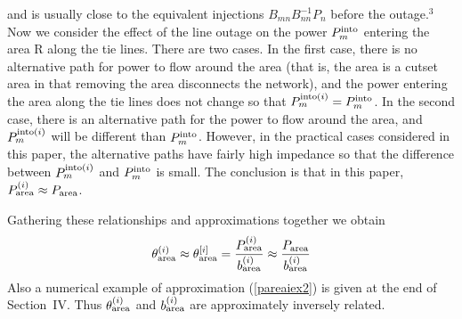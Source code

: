 \documentclass[conference]{IEEEtran}
\begin{document}
 and is usually close to the equivalent injections $B_{mn}B_{nn}^{-1}P_{n}$ before the outage.$^{3}$
 Now we consider the effect of the line outage on the power $P_m^{\rm into}$ entering the area R along the tie lines.
 There are two cases.  In the first case, there is no alternative path for power to flow around the area 
 (that is, the area is a cutset area \cite{DobsonHICSS10,DobsonPESGM10} in that removing the area disconnects the network),
 and the power entering the area along the tie lines does not change so that $P_m^{{\rm into}(i)}=P_m^{\rm into}$.
 In the second case, there is an alternative path for the power to flow around the area,
 and  $P_m^{{\rm into}(i)}$ will be different than $P_m^{\rm into}$.
 However, in the practical cases considered in this paper, the alternative paths have fairly high impedance so that the difference 
 between $P_m^{{\rm into}(i)}$ and $P_m^{\rm into}$ is small.
 The conclusion is that in this paper, $P^{(i)}_{\rm area}\approx P_{\rm area}$.
  
 Gathering these relationships and approximations together we obtain
 \begin{align}
 \theta^{(i)}_{\rm area}\approx
 \theta^{[i]}_{\rm area}
 =\frac{P^{(i)}_{\rm area}}{b^{(i)}_{\rm area}}\approx 
 \frac{P_{\rm area}}{b^{(i)}_{\rm area}}
 \label{pareaiex2}
 \end{align}
Also a numerical example of approximation (\ref{pareaiex2}) is given at the end of Section~IV.
Thus  $\theta^{(i)}_{\rm area}$ and $b^{(i)}_{\rm area}$ are approximately inversely related.
\end{document}
